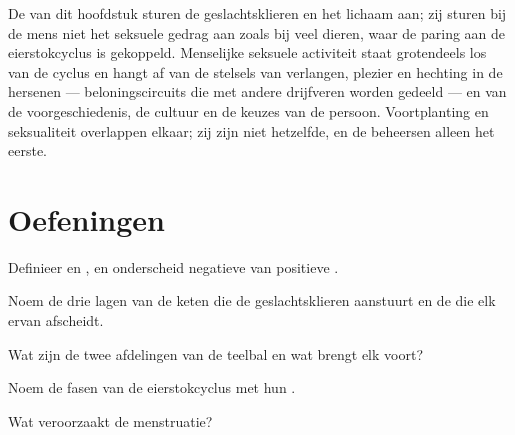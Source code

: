 \begin{remark}\label{rem:g11:hormones-and-reproduction:brain}
De  van dit hoofdstuk sturen de geslachtsklieren en het lichaam
aan; zij sturen bij de mens niet het seksuele gedrag aan zoals bij veel
dieren, waar de paring aan de eierstokcyclus is gekoppeld. Menselijke
seksuele activiteit staat grotendeels los van de cyclus en hangt af van
de stelsels van verlangen, plezier en hechting in de hersenen ---
beloningscircuits die met andere drijfveren worden gedeeld --- en van de
voorgeschiedenis, de cultuur en de keuzes van de persoon. Voortplanting
en seksualiteit overlappen elkaar; zij zijn niet hetzelfde, en de 
beheersen alleen het eerste.
\end{remark}

\section{Oefeningen}

\begin{exercise}[$\star$]\label{exo:g11:hormones-and-reproduction:1}
Definieer  en , en onderscheid negatieve van
positieve .
\end{exercise}

\begin{exercise}[$\star$]\label{exo:g11:hormones-and-reproduction:2}
Noem de drie lagen van de keten die de geslachtsklieren aanstuurt en de
 die elk ervan afscheidt.
\end{exercise}

\begin{exercise}[$\star$]\label{exo:g11:hormones-and-reproduction:3}
Wat zijn de twee afdelingen van de teelbal en wat brengt elk voort?
\end{exercise}

\begin{exercise}[$\star$]\label{exo:g11:hormones-and-reproduction:4}
Noem de fasen van de eierstokcyclus met hun .
\end{exercise}

\begin{exercise}[$\star$]\label{exo:g11:hormones-and-reproduction:5}
Wat veroorzaakt de menstruatie?
\end{exercise}


